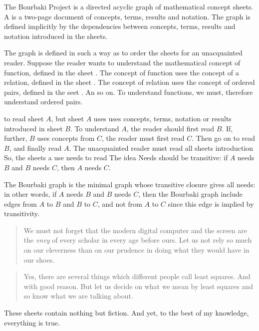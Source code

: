 
The Bourbaki Project is a directed acyclic graph of
mathematical concept sheets.
A  is a two-page document of
concepts, terms, results and notation.
The graph is defined implicitly by
the dependencies between concepts, terms,
results and notation introduced in the sheets.

The graph is defined in such a way as to
order the sheets for an unacquainted reader.
Suppose the reader wants to understand the
mathematical concept of function, defined
in the sheet .
The concept of function uses the concept of a
relation,
defined in the sheet .
The concept of relation uses the
concept of ordered pairs, defined in
the seet .
An so on.
To understand functions, we must, therefore
understand ordered pairs.

to read sheet
$A$, but sheet $A$ uses
uses concepts, terms,
notation or results introduced in sheet $B$.
To understand $A$, the reader should first read $B$.
If, further, $B$ uses concepts from $C$, the reader
must first read $C$.
Then go on to read $B$, and finally read $A$.
The unacquainted reader must read all
sheets introduction
So, the sheets a use needs to read
The idea
Needs should be transitive: if $A$ needs
$B$ and $B$ needs $C$, then $A$ needs $C$.


The Bourbaki graph is the minimal graph
whose transitive closure gives all
needs: in other words, if $A$ needs $B$
and $B$ needs $C$, then the Bourbaki
graph include edges from $A$ to $B$ and
$B$ to $C$, and not from $A$ to $C$ since
this edge is implied by transitivity.

\begin{quote}
We must not forget that the
modern digital computer and
the screen are the \textit{envy} of
every scholar in every age
before ours. Let us not rely
so much
on our cleverness
than on our prudence in doing
what they would have in our shoes.
\end{quote}

\begin{quote}
Yes, there are several things
which different people call
least squares. And with good
reason. But let us decide on
what we mean by least squares
and so know what we are talking
about.
\end{quote}

These sheets contain nothing
but fiction. And yet, to the best
of my knowledge, everything
is true.

